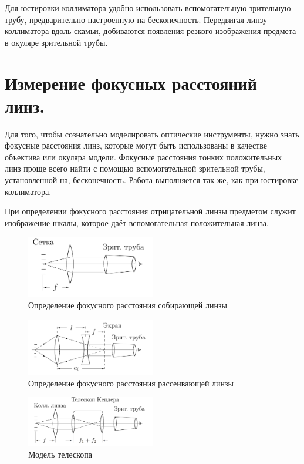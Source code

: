 \documentclass[a4paper, 12pt]{article}%
\begin{document}
	Для юстировки коллиматора удобно использовать вспомогательную зрительную трубу, предварительно настроенную на бесконечность. Передвигая
	линзу коллиматора вдоль скамьи, добиваются появления резкого изображения предмета в окуляре зрительной трубы.
	
	\section*{Измерение фокусных расстояний линз.} Для того, чтобы сознательно
	моделировать оптические инструменты, нужно знать фокусные расстояния
	линз, которые могут быть использованы в качестве объектива или окуляра модели. Фокусные расстояния тонких положительных линз проще всего
	найти с помощью вспомогательной зрительной трубы, установленной на, бесконечность. Работа выполняется так же, как при юстировке коллиматора.
	
	При определении фокусного расстояния отрицательной линзы предметом
	служит изображение шкалы, которое даёт вспомогательная положительная
	линза.
	
	\begin{figure}
			\begin{center}
				\includegraphics[width = 0.5\textwidth]{images/412-1.png}
				\caption{Определение фокусного расстояния собирающей линзы}
			\end{center}
		\end{figure}
		
	\begin{figure}
			\begin{center}
				\includegraphics[width = 0.5\textwidth]{images/412-2.png}
				\caption{Определение фокусного расстояния рассеивающей линзы}
			\end{center}
		\end{figure}
		
	\begin{figure}
			\begin{center}
				\includegraphics[width = 0.5\textwidth]{images/412-3.png}
				\caption{Модель телескопа}
			\end{center}
		\end{figure}
		
\end{document}
